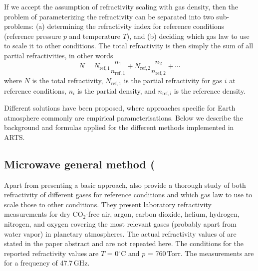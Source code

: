 If we accept the assumption of refractivity scaling with gas
density, then the problem of parameterizing the refractivity can
be separated into two sub-problems: (a) determining the refractivity
index for reference conditions (reference pressure $p$ and temperature
$T$), and (b) deciding which gas law to use to scale it to other
conditions. The total refractivity is then simply the sum of all
partial refractivities, in other words
\begin{equation}
  \label{eq:N_density}
  N = N_{\mathrm{ref},1} \frac{n_1}{n_\mathrm{ref,1}} + 
      N_{\mathrm{ref},2} \frac{n_2}{n_\mathrm{ref,2}} + \cdots
\end{equation}
where $N$ is the total refractivity, $N_{\mathrm{ref},1}$ is the
partial refractivity for gas $i$ at reference conditions, $n_i$ is
the partial density, and $n_\mathrm{ref,i}$ is the reference density.

Different solutions have been proposed, where approaches specific for Earth
atmosphere commonly are empirical parameterisations.
Below we describe the background and formulas applied for the different methods
implemented in ARTS.

\subsection{Microwave general method (}
 \label{sec:rindex:mwgeneral}

Apart from presenting a basic approach, \citet{newell65:_absolute_jap} also
provide a thorough study of both refractivity of different gases for reference
conditions and which gas law to use to scale those to other
conditions. They present laboratory
refractivity measurements for dry CO$_2$-free air, argon,
carbon dioxide, helium, hydrogen, nitrogen, and oxygen covering the
most relevant gases (probably apart from water vapor) in planetary atmospheres.
The actual refractivity values of \citet{newell65:_absolute_jap}
are stated in the paper abstract and are not repeated here. The
conditions for the reported refractivity values are $T$ =
0$^\circ$C and $p$ = 760\,Torr. The measurements are for a frequency
of 47.7\,GHz.

